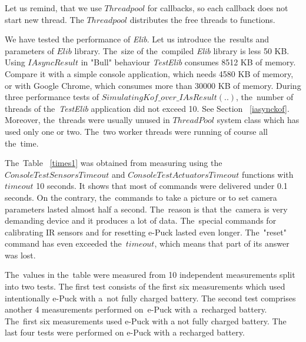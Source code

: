   \begin{remark}
   Let us remind, that we use $Threadpool$ for callbacks, so each callback
   does not start new thread.
   The $Threadpool$ distributes the free threads to functions.
  \end{remark}
  We have tested the performance of {\it Elib}. Let us introduce 
  the~results and parameters of $Elib$ library.
  The~size of the~compiled {\it Elib} library is less 50 KB.
  Using $IAsyncResult$ in "Bull" behaviour  {\it TestElib} consumes 8512 KB of memory.
  Compare it with a simple console application, which needs 4580 KB of memory, or with Google Chrome, 
  which consumes more than 30000 KB of memory.
  During three performance tests of $SimulatingKof\_over\_IAsResult(..)$,
  the~number of threads of the~{\it TestElib} application did not exceed 10. 
  See Section ~\ref{iasynckof}. Moreover, the~threads were usually unused
  in $ThreadPool$ system class which has used only one or two. 
  The~two worker threads were running of course all the~time.

  The~Table ~\ref{times1}  was obtained from measuring using the~$ConsoleTestSensorsTimeout$ and
  $ConsoleTestActuatorsTimeout$ functions with $timeout$ 10 seconds.
  It shows that most of commands were delivered under 0.1 seconds. 
  On the contrary, the~commands to take a picture or to set camera parameters 
   lasted almost half a second. 
  The~reason is that the~camera is very demanding device and it produces a lot of data.
  The~special commands for calibrating IR sensors and for resetting e-Puck lasted even longer.
  The~"reset" command has even exceeded the~$timeout$,
  which means that part of its answer was lost.

  The~values in the~table were measured from 10 independent measurements split into two tests. 
  The first test consists of the first six measurements which used intentionally e-Puck with
  a~not fully charged battery. The second test comprises another 4 measurements performed
  on~e-Puck with a~recharged battery.
  The~first six measurements used e-Puck with a not fully charged battery.
  The last four tests were performed on e-Puck with a recharged battery.


